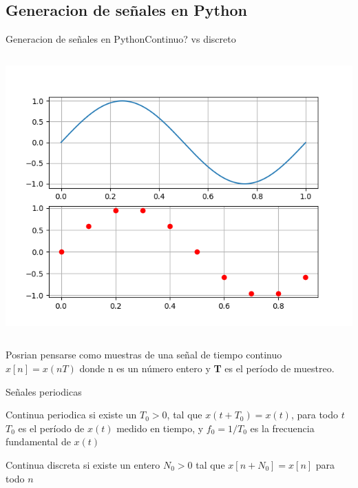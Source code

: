 \begin{darkframes}
    \subsection{Generacion de señales en Python}
    \begin{frame}{Generacion de señales en Python}{Continuo? vs discreto}
      \begin{columns}[onlytextwidth]
      
         \includegraphics[width=\textwidth]{1_clase/python_continuo_vs_discreto}
            \end{columns}
            Posrian pensarse como muestras de una señal de tiempo continuo $x[n] = x (nT)$ donde n es un número entero y \textbf{T} es el período de muestreo.
         \vfill
       \end{frame}
       \begin{frame}{Señales periodicas}
         \begin{block}{Continua periodica}
            si existe un $T_0>0$, tal que $x(t+T_0)=x(t)$, para todo $t$\\
            $T_0$ es el período de $x(t)$ medido en tiempo, y $f_0=1/T_0$ es la frecuencia fundamental de $x(t)$
      \end{block}
         \begin{block}{Continua discreta}
            si existe un entero $N_0>0$ tal que $x[n+N_0]=x[n]$ para
            todo $n$ \\

\end{block}
\end{frame}
\end{darkframes}
